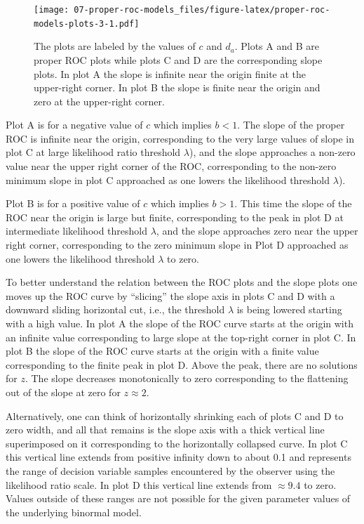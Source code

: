 \documentclass[
]{book}
\begin{document}
\begin{figure}
\centering
\texttt{[image: 07-proper-roc-models\_files/figure-latex/proper-roc-models-plots-3-1.pdf]}
\caption{\label{fig:proper-roc-models-plots-3}The plots are labeled by the values of \(c\) and \(d_a\). Plots A and B are proper ROC plots while plots C and D are the corresponding slope plots. In plot A the slope is infinite near the origin finite at the upper-right corner. In plot B the slope is finite near the origin and zero at the upper-right corner.}
\end{figure}

Plot A is for a negative value of \(c\) which implies \(b < 1\). The slope of the proper ROC is infinite near the origin, corresponding to the very large values of slope in plot C at large likelihood ratio threshold \(\lambda\)), and the slope approaches a non-zero value near the upper right corner of the ROC, corresponding to the non-zero minimum slope in plot C approached as one lowers the likelihood threshold \(\lambda\)).

Plot B is for a positive value of \(c\) which implies \(b > 1\). This time the slope of the ROC near the origin is large but finite, corresponding to the peak in plot D at intermediate likelihood threshold \(\lambda\), and the slope approaches zero near the upper right corner, corresponding to the zero minimum slope in Plot D approached as one lowers the likelihood threshold \(\lambda\) to zero.

To better understand the relation between the ROC plots and the slope plots one moves up the ROC curve by ``slicing'' the slope axis in plots C and D with a downward sliding horizontal cut, i.e., the threshold \(\lambda\) is being lowered starting with a high value. In plot A the slope of the ROC curve starts at the origin with an infinite value corresponding to large slope at the top-right corner in plot C. In plot B the slope of the ROC curve starts at the origin with a finite value corresponding to the finite peak in plot D. Above the peak, there are no solutions for \(z\). The slope decreases monotonically to zero corresponding to the flattening out of the slope at zero for \(z \approx 2\).

Alternatively, one can think of horizontally shrinking each of plots C and D to zero width, and all that remains is the slope axis with a thick vertical line superimposed on it corresponding to the horizontally collapsed curve. In plot C this vertical line extends from positive infinity down to about 0.1 and represents the range of decision variable samples encountered by the observer using the likelihood ratio scale. In plot D this vertical line extends from \(\approx 9.4\) to zero. Values outside of these ranges are not possible for the given parameter values of the underlying binormal model.
\end{document}
